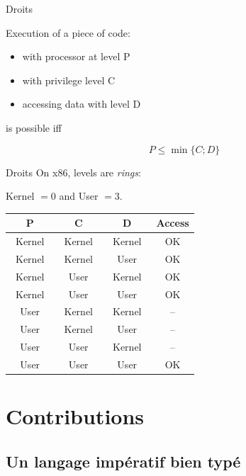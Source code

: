 \documentclass{beamer}
\begin{document}
\begin{frame}{Droits}

Execution of a piece of code:

\begin{itemize}
    \item with processor at level P
    \item with privilege level C
    \item accessing data with level D
\end{itemize}

is possible iff

\[ P ≤ \min\{C; D\} \]

\end{frame}

\begin{frame}{Droits}
On x86, levels are \emph{rings}:

Kernel $= 0$ and User $= 3$.

\begin{center}
\def\modeK{~Kernel~}
\def\modeU{~User~}
\def\accOK{OK}
\def\accNO{--}
\begin{tabular}{cccc}
\toprule
  P
& C
& D
& Access \\
\midrule
  \modeK{} & \modeK{} & \modeK{} & \accOK \\
  \modeK{} & \modeK{} & \modeU{} & \accOK \\
  \modeK{} & \modeU{} & \modeK{} & \accOK \\
  \modeK{} & \modeU{} & \modeU{} & \accOK \\
  \modeU{} & \modeK{} & \modeK{} & \accNO \\
  \modeU{} & \modeK{} & \modeU{} & \accNO \\
  \modeU{} & \modeU{} & \modeK{} & \accNO \\
  \modeU{} & \modeU{} & \modeU{} & \accOK \\
\bottomrule
\end{tabular}
\end{center}

\end{frame}

\section{Contributions}

\subsection{Un langage impératif bien typé}
\end{document}
